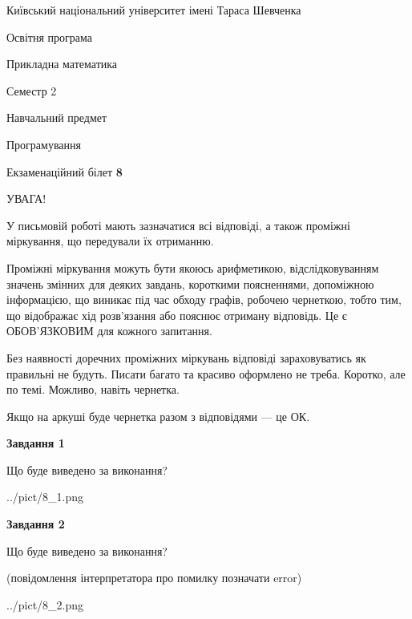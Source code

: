 \documentclass[12pt, ukrainian]{article}
\begin{document}
{{\begin {small}\par
{ \center  Київський національний університет імені Тараса Шевченка \par}
{\parbox {5 cm}{Освітня програма \hfill}{\parbox {7 cm}{Прикладна математика\hfill}}\parbox {6 cm}{\hfill Семестр 2}}\par
{\parbox {5 cm} {Навчальний предмет \hfill}\parbox {7 cm}{Програмування \hfill}\parbox {6cm}{\hfill}\par}\vspace{-7pt} \end{small}}{\center Екзаменаційний білет \No \textbf
{ 8 }\par}}
{
\begin {large}
УВАГА!

У письмовій роботі мають зазначатися всі відповіді, а також проміжні міркування, що передували їх отриманню.

Проміжні міркування можуть бути якоюсь арифметикою, відслідковуванням зна\-чень змінних для деяких завдань,
короткими поясненнями, допоміжною інформацією, що виникає під час обходу графів, робочею чернеткою,
тобто тим, що відображає хід розв’язання або пояснює отриману відповідь.
Це є ОБОВ’ЯЗКОВИМ для кожного запитання.

Без наявності доречних проміжних міркувань відповіді зараховуватись як правиль\-ні не будуть.
Писати багато та красиво оформлено не треба. Коротко, але по темі. Можли\-во, навіть чернетка.

Якщо на аркуші буде чернетка разом з відповідями --- це ОК.

\newpage

{\begin {center}\textbf{Завдання 1}\end {center}}\par
Що буде виведено за виконання?\par
\begin{center}
	{../pict/8_1.png}
\end{center}
\newpage

{\begin {center}\textbf{Завдання 2}\end {center}}\par
Що буде виведено за виконання?\par
 (повідомлення інтерпретатора про помилку позначати error)\par
\begin{center}
	{../pict/8_2.png}
\end{center}
\newpage


\end{large}}
\end{document}
